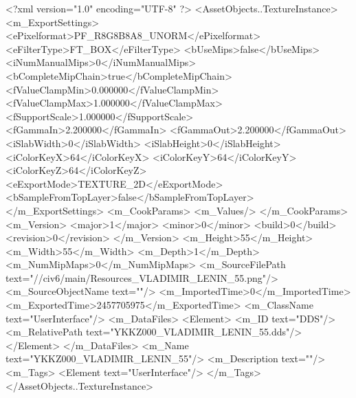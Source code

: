 <?xml version="1.0" encoding="UTF-8" ?>
<AssetObjects..TextureInstance>
	<m_ExportSettings>
		<ePixelformat>PF_R8G8B8A8_UNORM</ePixelformat>
		<eFilterType>FT_BOX</eFilterType>
		<bUseMips>false</bUseMips>
		<iNumManualMips>0</iNumManualMips>
		<bCompleteMipChain>true</bCompleteMipChain>
		<fValueClampMin>0.000000</fValueClampMin>
		<fValueClampMax>1.000000</fValueClampMax>
		<fSupportScale>1.000000</fSupportScale>
		<fGammaIn>2.200000</fGammaIn>
		<fGammaOut>2.200000</fGammaOut>
		<iSlabWidth>0</iSlabWidth>
		<iSlabHeight>0</iSlabHeight>
		<iColorKeyX>64</iColorKeyX>
		<iColorKeyY>64</iColorKeyY>
		<iColorKeyZ>64</iColorKeyZ>
		<eExportMode>TEXTURE_2D</eExportMode>
		<bSampleFromTopLayer>false</bSampleFromTopLayer>
	</m_ExportSettings>
	<m_CookParams>
		<m_Values/>
	</m_CookParams>
	<m_Version>
		<major>1</major>
		<minor>0</minor>
		<build>0</build>
		<revision>0</revision>
	</m_Version>
	<m_Height>55</m_Height>
	<m_Width>55</m_Width>
	<m_Depth>1</m_Depth>
	<m_NumMipMaps>0</m_NumMipMaps>
	<m_SourceFilePath text="//civ6/main/Resources_VLADIMIR_LENIN_55.png"/>
	<m_SourceObjectName text=""/>
	<m_ImportedTime>0</m_ImportedTime>
	<m_ExportedTime>2457705975</m_ExportedTime>
	<m_ClassName text="UserInterface"/>
	<m_DataFiles>
		<Element>
			<m_ID text="DDS"/>
			<m_RelativePath text="YKKZ000_VLADIMIR_LENIN_55.dds"/>
		</Element>
	</m_DataFiles>
	<m_Name text="YKKZ000_VLADIMIR_LENIN_55"/>
	<m_Description text=""/>
	<m_Tags>
		<Element text="UserInterface"/>
	</m_Tags>
</AssetObjects..TextureInstance>

